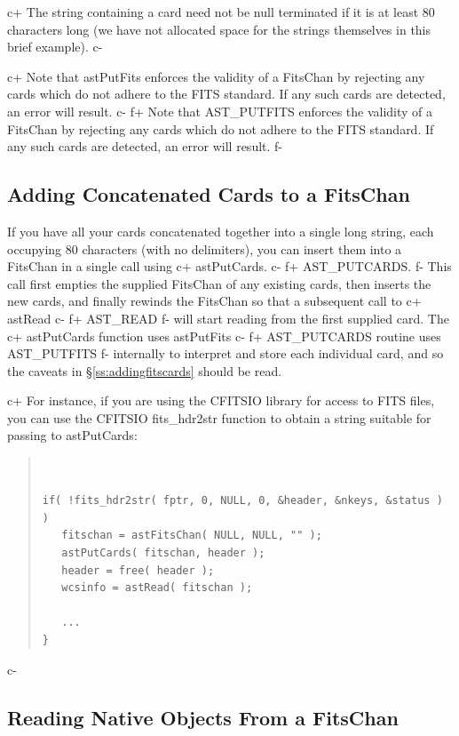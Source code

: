 \documentclass[twoside,11pt]{article}
\newcommand{\secref}[1]{\S\ref{#1}}
\newcommand{\secref}[1]{\ref{#1}}
\begin{document}
c+
The string containing a card need not be null terminated if it is at
least 80 characters long (we have not allocated space for the strings
themselves in this brief example).
c-

c+
Note that astPutFits enforces the validity of a FitsChan by rejecting
any cards which do not adhere to the FITS standard. If any such cards
are detected, an error will result.
c-
f+
Note that AST\_PUTFITS enforces the validity of a FitsChan by
rejecting any cards which do not adhere to the FITS standard. If any
such cards are detected, an error will result.
f-

\subsection{\label{ss:addingmulticards}Adding Concatenated Cards to a FitsChan}

If you have all your cards concatenated together into a single long string,
each occupying 80 characters (with no delimiters), you can insert them
into a FitsChan in a single call using
c+
astPutCards.
c-
f+
AST\_PUTCARDS.
f-
This call first empties the supplied FitsChan of any existing cards, then
inserts the new cards, and finally rewinds the FitsChan so that a
subsequent call to
c+
astRead
c-
f+
AST\_READ
f-
will start reading from the first supplied card. The
c+
astPutCards function uses astPutFits
c-
f+
AST\_PUTCARDS routine uses AST\_PUTFITS
f-
internally to interpret and store each individual card, and so the
caveats in \secref{ss:addingfitscards} should be read.

c+
For instance, if you are using the CFITSIO library for access to FITS
files, you can use the CFITSIO fits\_hdr2str function to obtain a string suitable
for passing to astPutCards:

\begin{quote}
\small
\begin{verbatim}


if( !fits_hdr2str( fptr, 0, NULL, 0, &header, &nkeys, &status ) )
   fitschan = astFitsChan( NULL, NULL, "" );
   astPutCards( fitschan, header );
   header = free( header );
   wcsinfo = astRead( fitschan );

   ...
}
\end{verbatim}
\normalsize
\end{quote}


c-

\subsection{\label{ss:readingnativefits}Reading Native Objects From a FitsChan}
\end{document}
